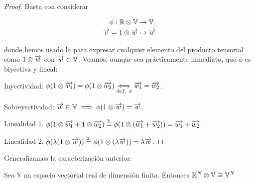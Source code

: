 \begin{proof}
	Basta con considerar

	\begin{equation}
		\begin{split}
			\phi: \mathbb{R} \otimes \mathbb{V} &\to \mathbb{V} \\
			\overrightarrow{v} = 1 \otimes \overrightarrow{w} &\mapsto \overrightarrow{w}
		\end{split}
	\end{equation}

	donde hemos usado la  para expresar cualquier elemento del producto tensorial como $1 \otimes \overrightarrow{w}$ con $\overrightarrow{w} \in \mathbb{V}$. Veamos, aunque sea prácticamente inmediato, que $\phi$ es biyectiva y lineal:

	Inyectividad: $\phi(1 \otimes \overrightarrow{w_1}) = \phi(1 \otimes \overrightarrow{w_2}) \underset{def.\ \phi}{\Longleftrightarrow} \overrightarrow{w_1} = \overrightarrow{w_2}$.

	Sobreyectividad: $\overrightarrow{w} \in \mathbb{V} \implies \phi(1 \otimes \overrightarrow{w}) = \overrightarrow{w}$.

	Linealidad 1. $\phi(1 \otimes \overrightarrow{w_1} + 1 \otimes \overrightarrow{w_2}) \stackrel{\text{3.}}{=} \phi(1 \otimes (\overrightarrow{w_1} + \overrightarrow{w_2})) = \overrightarrow{w_1} + \overrightarrow{w_2}$.

	Linealidad 2. $\phi(\lambda (1 \otimes \overrightarrow{w})) \stackrel{\text{2.}}{=} \phi(1 \otimes (\lambda \overrightarrow{w})) = \lambda \overrightarrow{w}$.

\end{proof}

Generalizamos la caracterización anterior:

\begin{proposicion} Sea $\mathbb{V}$ un espacio vectorial real de dimensión finita. Entonces $\mathbb{R}^N \otimes \mathbb{V}  \cong \mathbb{V}^N$
\end{proposicion}

